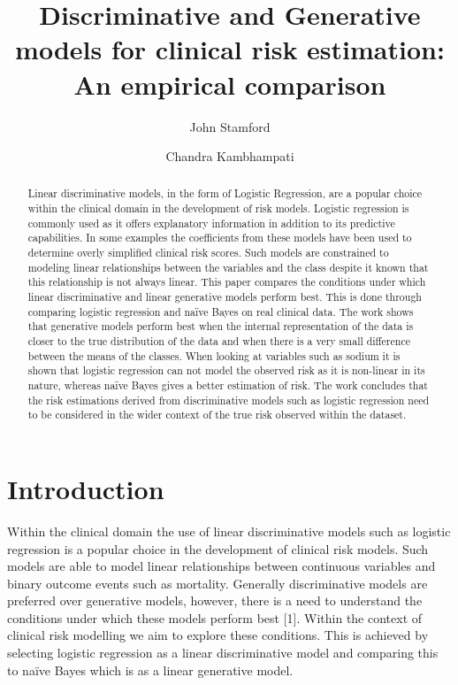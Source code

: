 \documentclass[a4paper,UKenglish]{oasics-v2016}
\title{Discriminative and Generative models for clinical risk estimation: An empirical comparison}
\author[1]{John Stamford}
\author[2]{Chandra Kambhampati}
\affil[1]{Department of Computer Science, The University of Hull, Kingston upon Hull, HU6 7RX\\
\texttt{j.stamford@2014.hull.ac.uk}}
\affil[2]{Department of Computer Science, The University of Hull, Kingston upon Hull, HU6 7RX\\
\texttt{c.kambhampati@hull.ac.uk}}
\begin{document}
\maketitle

\begin{abstract}
Linear discriminative models, in the form of Logistic Regression, are a popular choice within the clinical domain in the development of risk models. Logistic regression is commonly used as it offers explanatory information in addition to its predictive capabilities. In some examples the coefficients from these models have been used to determine overly simplified clinical risk scores. Such models are constrained to modeling linear relationships between the variables and the class despite it known that this relationship is not always linear. This paper compares the conditions under which linear discriminative and linear generative models perform best. This is done through comparing logistic regression and naïve Bayes on real clinical data. The work shows that generative models perform best when the internal representation of the data is closer to the true distribution of the data and when there is a very small difference between the means of the classes. When looking at variables such as sodium it is shown that logistic regression can not model the observed risk as it is non-linear in its nature, whereas naïve Bayes gives a better estimation of risk. The work concludes that the risk estimations derived from discriminative models such as logistic regression need to be considered in the wider context of the true risk observed within the dataset.
 \end{abstract}



\section{Introduction}
Within the clinical domain the use of linear discriminative models such as logistic regression is a popular choice in the development of clinical risk models. Such models are able to model linear relationships between continuous variables and binary outcome events such as mortality. Generally discriminative models are preferred over generative models, however, there is a need to understand the conditions under which these models perform best [1]. Within the context of clinical risk modelling we aim to explore these conditions. This is achieved by selecting logistic regression as a linear discriminative model and comparing this to naïve Bayes which is as a linear generative model.
\end{document}
